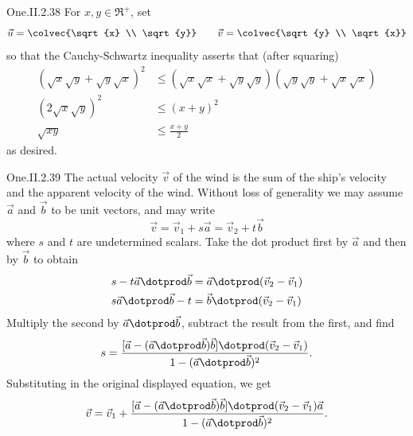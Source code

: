 \begin{ans}{One.II.2.38}
      For \( x,y\in\Re^+ \), set
      \begin{equation*}
        \vec{u}=\colvec{\sqrt{x} \\ \sqrt{y}}
        \qquad
        \vec{v}=\colvec{\sqrt{y} \\ \sqrt{x}}
      \end{equation*}
      so that the Cauchy-Schwartz inequality asserts that (after squaring)
      \begin{align*}
        (\sqrt{x}\sqrt{y}+\sqrt{y}\sqrt{x})^2
        &\leq(\sqrt{x}\sqrt{x}+\sqrt{y}\sqrt{y})(\sqrt{y}\sqrt{y}
                                              +\sqrt{x}\sqrt{x})   \\
        (2\sqrt{x}\sqrt{y})^2
        &\leq(x+y)^2                            \\
        \sqrt{xy}
        &\leq\frac{x+y}{2}
      \end{align*}
      as desired.
    
\end{ans}
\begin{ans}{One.II.2.39}
      \answerasgiven %
      The actual velocity \( \vec{v} \) of the wind is the sum of the
      ship's velocity and the apparent velocity of the wind.
      Without loss of generality we may assume \( \vec{a} \) and
      \( \vec{b} \) to be unit vectors, and may write
      \begin{equation*}
         \vec{v}=\vec{v}_1+s\vec{a}=\vec{v}_2+t\vec{b}
      \end{equation*}
      where \( s \) and \( t \) are undetermined scalars.
      Take the dot product first by \( \vec{a} \) and then by \( \vec{b} \)
      to obtain
      \begin{align*}
         s-t\vec{a}\dotprod\vec{b}
         &=\vec{a}\dotprod(\vec{v}_2-\vec{v}_1)    \\
         s\vec{a}\dotprod\vec{b}-t
         &=\vec{b}\dotprod(\vec{v}_2-\vec{v}_1)
      \end{align*}
      Multiply the second by \( \vec{a}\dotprod\vec{b} \),
      subtract the result from the first, and find
      \begin{equation*}
         s=
         \frac{[\vec{a}-(\vec{a}\dotprod\vec{b})\vec{b}]
                   \dotprod(\vec{v}_2-\vec{v}_1)
              }{1-(\vec{a}\dotprod\vec{b})^2}.
      \end{equation*}
      Substituting in the original displayed equation, we get
      \begin{equation*}
         \vec{v}=\vec{v}_1+
         \frac{[\vec{a}-(\vec{a}\dotprod\vec{b})\vec{b}]
                  \dotprod(\vec{v}_2-\vec{v}_1)
              \vec{a}}{1-(\vec{a}\dotprod\vec{b})^2}.
      \end{equation*}
    
\end{ans}
